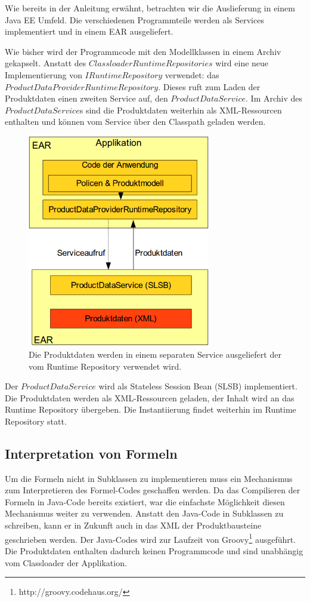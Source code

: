 \documentclass[headsepline=true, footsepline=true]{scrartcl}
\begin{document}
Wie bereits in der Anleitung erwähnt, betrachten wir die Auslieferung in einem
Java EE Umfeld. Die verschiedenen Programmteile werden als Services
implementiert und in einem EAR ausgeliefert.

Wie bisher wird der Programmcode mit den Modellklassen in einem Archiv gekapselt.
Anstatt des $ClassloaderRuntimeRepositories$ wird eine neue Implementierung von
$IRuntimeRepository$ verwendet: das $ProductDataProviderRuntimeRepository$.
Dieses ruft zum Laden der Produktdaten einen zweiten Service auf, den
$ProductDataService$. Im Archiv des $ProductDataService$s sind die Produktdaten
weiterhin als XML-Ressourcen enthalten und können vom Service über den Classpath
geladen werden.

\begin{figure}[htb] \centering
\includegraphics[width=8cm]{./pics/service_architecture.png}
\caption{Die Produktdaten werden in einem separaten Service ausgeliefert der
vom Runtime Repository verwendet wird.}
\label{service_architecture}
\end{figure}

Der $ProductDataService$ wird als Stateless Session Bean (SLSB) implementiert.
Die Produktdaten werden als XML-Ressourcen geladen, der Inhalt wird an das
Runtime Repository übergeben. Die Instantiierung findet weiterhin im Runtime
Repository statt.

\subsection{Interpretation von Formeln}

Um die Formeln nicht in Subklassen zu implementieren muss ein Mechanismus zum
Interpretieren des Formel-Codes geschaffen werden. Da das Compilieren der
Formeln in Java-Code bereits existiert, war die einfachste Möglichkeit diesen
Mechanismus weiter zu verwenden. Anstatt den Java-Code in Subklassen zu
schreiben, kann er in Zukunft auch in das XML der Produktbausteine geschrieben
werden. Der Java-Codes wird zur Laufzeit von
Groovy\footnote{http://groovy.codehaus.org/} ausgeführt. Die Produktdaten
enthalten dadurch keinen Programmcode und sind unabhängig vom Classloader der Applikation.
\end{document}
